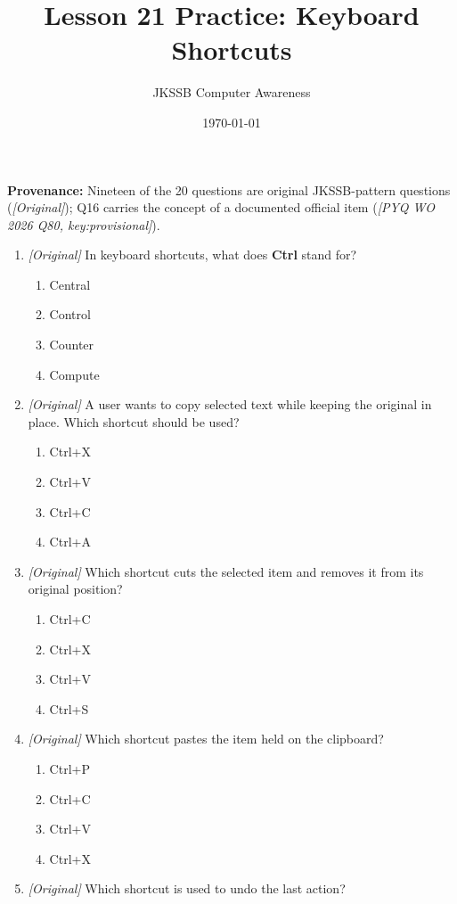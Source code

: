 \documentclass[11pt]{article}
\title{Lesson 21 Practice: Keyboard Shortcuts}
\author{JKSSB Computer Awareness}
\date{\today}
\begin{document}
\maketitle
\noindent\textbf{Provenance:} Nineteen of the 20 questions are original
JKSSB-pattern questions (\textit{[Original]}); Q16 carries the concept of a
documented official item (\textit{[PYQ WO 2026 Q80, key:provisional]}).

\begin{enumerate}[label=\textbf{Q\arabic*.}, leftmargin=*]
\item \textit{[Original]} In keyboard shortcuts, what does \textbf{Ctrl}
  stand for?
  \begin{enumerate}[label=\Alph*.]
    \item Central
    \item Control
    \item Counter
    \item Compute
  \end{enumerate}
\item \textit{[Original]} A user wants to copy selected text while keeping the
  original in place. Which shortcut should be used?
  \begin{enumerate}[label=\Alph*.]
    \item Ctrl+X
    \item Ctrl+V
    \item Ctrl+C
    \item Ctrl+A
  \end{enumerate}
\item \textit{[Original]} Which shortcut cuts the selected item and removes it
  from its original position?
  \begin{enumerate}[label=\Alph*.]
    \item Ctrl+C
    \item Ctrl+X
    \item Ctrl+V
    \item Ctrl+S
  \end{enumerate}
\item \textit{[Original]} Which shortcut pastes the item held on the
  clipboard?
  \begin{enumerate}[label=\Alph*.]
    \item Ctrl+P
    \item Ctrl+C
    \item Ctrl+V
    \item Ctrl+X
  \end{enumerate}
\item \textit{[Original]} Which shortcut is used to undo the last action?

\end{enumerate}
\end{document}
